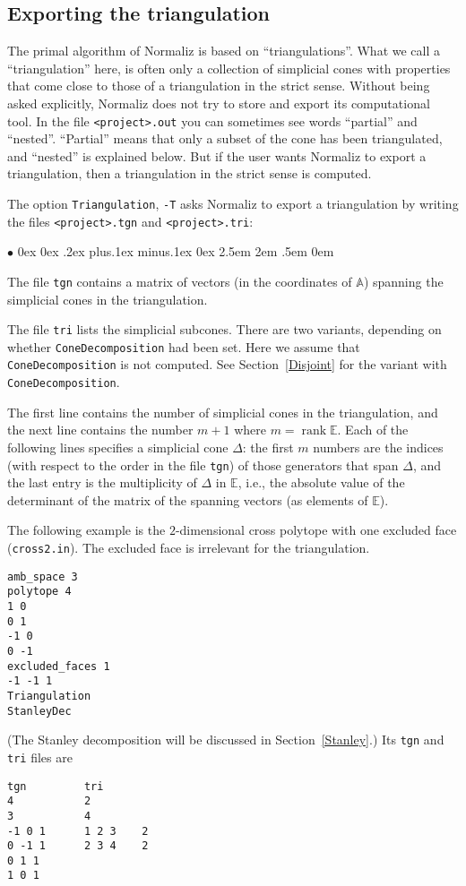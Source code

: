 \documentclass[12pt,a4paper]{scrartcl}
\newcommand{\stdli}{ \topsep0ex \partopsep0ex %
\parsep.2ex plus.1ex minus.1ex \itemsep0ex%
\leftmargin2.5em \labelwidth2em \labelsep.5em \rightmargin0em}%
\renewenvironment{itemize}{\begin{list}{{$\bullet$}}{\stdli}}{\end{list}}
\theoremstyle{definition}
\def\EE{{\mathbb E}}
\def\AA{{\mathbb A}}
\DeclareMathOperator{\rank}{rank}
\def\itemtt[#1]{\item[\textbf{\ttt{#1}}]}
\def\ttt{\texttt}
\begin{document}
\subsection{Exporting the triangulation}\label{Triang}

The primal algorithm of Normaliz is based on ``triangulations''. What we call a ``triangulation'' here, is often only a collection of simplicial cones with properties that come close to those of a triangulation in the strict sense. Without being asked explicitly, Normaliz does not try to store and export its computational tool. In the file \verb|<project>.out| you can sometimes see words ``partial'' and ``nested''. ``Partial'' means that only a subset of the cone has been triangulated, and ``nested'' is explained below.
But if the user wants Normaliz to export a triangulation, then a triangulation in the strict sense is computed.

The option \ttt{Triangulation}, \ttt{-T} asks Normaliz to export a triangulation by writing the files
\ttt{<project>.tgn} and \verb|<project>.tri|:

\begin{itemize}
	
	\itemtt[tgn] The file \ttt{tgn} contains a matrix of vectors (in the
	coordinates of $\AA$) spanning the simplicial cones in
	the triangulation.
	
	\itemtt[tri]
	The file \ttt{tri} lists the simplicial subcones. There are two variants, depending on whether \verb|ConeDecomposition| had been set. Here we assume that \verb|ConeDecomposition| is not computed. See Section~\ref{Disjoint} for the variant with \verb|ConeDecomposition|.
	
	The first line contains the number of simplicial cones
	in the triangulation, and the next line contains the
	number $m+1$ where $m=\rank \EE$. Each of the following
	lines specifies a simplicial cone $\Delta$: the first
	$m$ numbers are the indices (with respect to the order
	in the file \ttt{tgn}) of those generators that span
	$\Delta$, and the last entry is the multiplicity of
	$\Delta$ in $\EE$, i.e., the absolute value of the
	determinant of the matrix of the spanning vectors (as
	elements of $\EE$).
\end{itemize}

The following example is the $2$-dimensional cross polytope with one excluded face (\verb|cross2.in|). The excluded face is irrelevant for the triangulation.

\begin{Verbatim}
amb_space 3
polytope 4
1 0
0 1
-1 0
0 -1
excluded_faces 1
-1 -1 1
Triangulation
StanleyDec        
\end{Verbatim}
(The Stanley decomposition will be discussed in Section~\ref{Stanley}.)
Its \verb|tgn| and \verb|tri| files are
\begin{Verbatim}
tgn         tri
4           2
3           4
-1 0 1      1 2 3    2
0 -1 1      2 3 4    2
0 1 1       
1 0 1 
\end{Verbatim}
\end{document}
